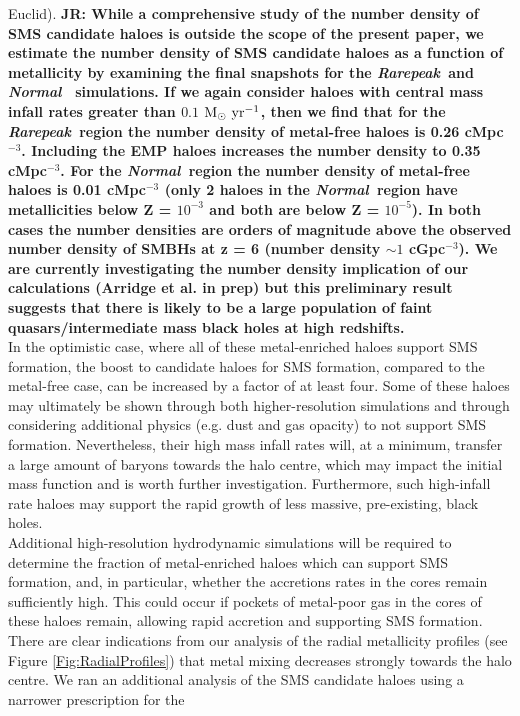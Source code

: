 \documentclass[twocolumn,iop,revtex4]{openjournal}
\newcommand{\msolaryrc} {$\rm{M_{\odot}~yr^{-1}}$}
\newcommand{\rarepeak} {\textit{Rarepeak~}}
\newcommand{\normal} {\textit{Normal~}}
\def\jr#1{{\color{blue} \bf JR:  #1}}
\begin{document}
Euclid). \jr{While a comprehensive study of the number density of SMS candidate haloes is outside the
scope of the present paper, we estimate the number density of SMS candidate
haloes as a function of metallicity by examining the final snapshots for the \rarepeak and \normal
simulations. If we again consider haloes with central mass infall rates greater than $0.1$
\msolaryrc, then we find that for the \rarepeak region the number density of metal-free haloes
is 0.26 cMpc$^{-3}$. Including the EMP haloes increases the number density to 0.35 cMpc$^{-3}$. For
the \normal region the number density of metal-free haloes is 0.01 cMpc$^{-3}$ (only 2 haloes
in the \normal region have metallicities below Z = $10^{-3}$ and both are below Z = $10^{-5}$). In
both cases the number densities are orders of magnitude above the observed number density of
SMBHs at z = 6 (number density $\sim 1$ cGpc$^{-3}$). We are currently investigating the number
density implication of our calculations (Arridge et al. in prep) but this preliminary result
suggests that there is likely to be a large population of faint quasars/intermediate mass
black holes at high redshifts.}
\\
\indent In the optimistic case, where all of these metal-enriched haloes support SMS formation, the
boost to
candidate haloes for SMS formation, compared to the metal-free case, can be increased by a factor of
at least four. Some of these haloes may ultimately be shown through both  higher-resolution simulations
and through considering additional physics (e.g. dust and gas opacity) 
to not support SMS formation. Nevertheless, their high mass infall rates will, at a minimum, transfer
a large amount of baryons towards the halo centre, which may impact the initial mass function and
is worth further investigation. Furthermore, such high-infall rate haloes may support the rapid
growth of less massive, pre-existing, black holes. \\
\indent Additional high-resolution hydrodynamic simulations will be required to
determine the fraction of metal-enriched haloes which can support SMS formation, and, in particular,
whether the accretions rates in the cores remain sufficiently high.  This could occur if pockets
of metal-poor gas in the cores of these haloes remain, allowing rapid accretion and supporting SMS
formation. There are clear indications from our analysis of the radial metallicity profiles
(see Figure \ref{Fig:RadialProfiles}) that metal mixing decreases strongly towards the halo centre.
We ran an additional analysis of the SMS candidate haloes using a narrower prescription for the
\end{document}
